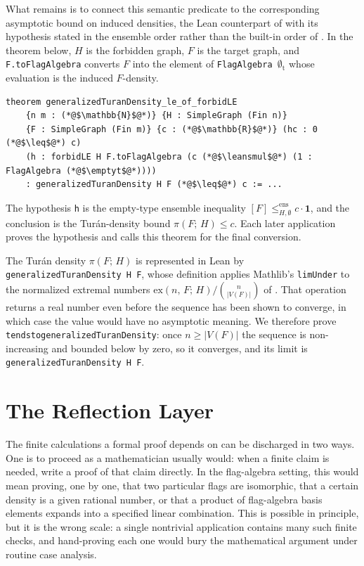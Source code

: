 \documentclass[acmsmall,screen=true,acmthm=false]{acmart}
\newcommand{\tdensity}[2]{\pi(#1;\,#2)}
\DeclareRobustCommand{\lean}[1]{{\def\_{\textunderscore\allowbreak}\texttt{#1}}}
\newcommand{\emptyt}{\emptyset_{\mathrm{t}}}
\newcommand{\leansmul}{\mathbin{\vcenter{\hbox{$\scriptstyle\bullet$}}}}
\begin{document}
What remains is to connect this semantic predicate to the corresponding
asymptotic bound on induced densities, the Lean counterpart of
 with its hypothesis stated in the ensemble order
rather than the built-in order of .  In the
theorem below, \(H\) is the forbidden graph, \(F\) is the target graph, and
\lean{F.toFlagAlgebra} converts \(F\) into the element of
\lean{FlagAlgebra $\emptyt$} whose evaluation is the induced \(F\)-density.
\begin{lstlisting}
theorem generalizedTuranDensity_le_of_forbidLE
    {n m : (*@$\mathbb{N}$@*)} {H : SimpleGraph (Fin n)}
    {F : SimpleGraph (Fin m)} {c : (*@$\mathbb{R}$@*)} (hc : 0 (*@$\leq$@*) c)
    (h : forbidLE H F.toFlagAlgebra (c (*@$\leansmul$@*) (1 : FlagAlgebra (*@$\emptyt$@*))))
    : generalizedTuranDensity H F (*@$\leq$@*) c := ...
\end{lstlisting}
The hypothesis \lean{h} is the empty-type ensemble inequality
\([F]\leq^{\mathrm{ens}}_{H,\emptyset}c\cdot\mathbf{1}\), and the conclusion is
the Tur\'an-density bound \(\tdensity{F}{H}\leq c\).  Each later application
proves the hypothesis and calls this theorem for the final conversion.

The Tur\'an density \(\tdensity{F}{H}\) is represented in Lean by
\lean{generalizedTuranDensity H F}, whose definition applies Mathlib's
\lean{limUnder} to the normalized extremal numbers
\(\mathrm{ex}(n,\,F;\,H)/\binom{n}{|V(F)|}\) of
.  That operation returns a real number
even before the sequence has been shown to converge, in which case the value
would have no asymptotic meaning.  We therefore prove
\lean{tendsto\_\allowbreak generalizedTuranDensity}: once \(n\geq |V(F)|\) the
sequence is non-increasing and bounded below by zero, so it converges, and its
limit is \lean{generalizedTuranDensity H F}.

\section{The Reflection Layer}
\label{sec:reflection}

The finite calculations a formal proof depends on can be discharged in two
ways.  One is to proceed as a
mathematician usually would: when a finite claim is needed, write a proof of
that claim directly.  In the flag-algebra setting, this would mean proving, one
by one, that two particular flags are isomorphic, that a certain density is a
given rational number, or that a product of flag-algebra basis elements expands into a specified
linear combination.  This is possible in principle, but it is the wrong scale:
a single nontrivial application contains many such finite checks, and hand-proving each
one would bury the mathematical argument under routine case analysis.
\end{document}
